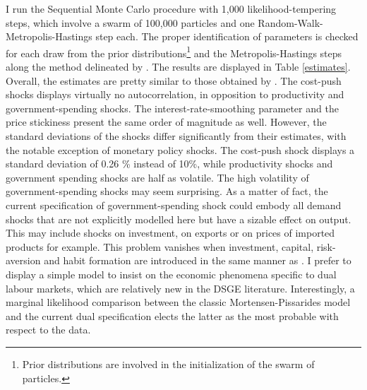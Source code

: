\documentclass[a4paper]{article}
\begin{document}
I run the Sequential Monte Carlo procedure with 1,000 likelihood-tempering steps, which involve a swarm of 100,000 particles and one Random-Walk-Metropolis-Hastings step each. The proper identification of parameters is checked for each draw from the prior distributions\footnote{Prior distributions are involved in the initialization of the swarm of particles.} and the Metropolis-Hastings steps along the method delineated by \citet{ISKREV2010189}. The results are displayed in Table \ref{estimates}. Overall, the estimates are pretty similar to those obtained by \citet{thomas2009labor}. The cost-push shocks displays virtually no autocorrelation, in opposition to productivity and government-spending shocks. The interest-rate-smoothing parameter and the price stickiness present the same order of magnitude as well. However, the standard deviations of the shocks differ significantly from their estimates, with the notable exception of monetary policy shocks. The cost-push shock displays a standard deviation of 0.26 \% instead of 10\%, while productivity shocks and government spending shocks are half as volatile. The high volatility of government-spending shocks may seem surprising. As a matter of fact, the current specification of government-spending shock could embody all demand shocks that are not explicitly modelled here but have a sizable effect on output. This may include shocks on investment, on exports or on prices of imported products for example. This problem vanishes when investment, capital, risk-aversion and habit formation are introduced in the same manner as \citet{doi:10.1111/j.1538-4616.2008.00180.x}. I prefer to display a simple model to insist on the economic phenomena specific to dual labour markets, which are relatively new in the DSGE literature. Interestingly, a marginal likelihood comparison between the classic Mortensen-Pissarides model and the current dual specification elects the latter as the most probable with respect to the data.




\appendix

\end{document}
